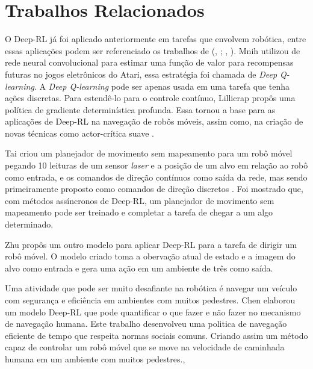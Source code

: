 \section{Trabalhos Relacionados}

O Deep-RL já foi aplicado anteriormente em tarefas que envolvem robótica, entre essas aplicações podem ser referenciado os trabalhos de (\citeauthor{kober2013reinforcement}, \citeyear{kober2013reinforcement}; \citeauthor{stone2005reinforcement}, \citeyear{stone2005reinforcement}).
Mnih \citeyearpar{mnih2013playing} utilizou de rede neural convolucional para estimar uma função de valor para recompensas futuras no jogos eletrônicos do Atari, essa estratégia foi chamada de \textit{Deep Q-learning}.
A \textit{Deep Q-learning} pode ser apenas usada em uma tarefa que tenha ações discretas. Para estendê-lo para o controle contínuo, Lillicrap \citeyearpar{lillicrap2015continuous} propôs uma política de gradiente determinística profunda.
Essa tornou a base para as aplicações de Deep-RL na navegação de robôs móveis, assim como, na criação de novas técnicas como actor-crítica suave \cite{haarnoja2018soft}.

Tai \citeyearpar{tai2017virtual} criou um planejador de movimento sem mapeamento para um robô móvel pegando 10 leituras de um sensor \textit{laser} e a posição de um alvo em relação ao robô como entrada, e os comandos de direção contínuos como saída da rede, mas sendo primeiramente proposto como comandos de direção discretos \cite{tai2016towards}. Foi mostrado que, com métodos assíncronos de Deep-RL, um planejador de movimento sem mapeamento pode ser treinado e completar a tarefa de chegar a um algo determinado.

Zhu \citeyearpar{zhu2017target} propôs um outro modelo para aplicar Deep-RL para a tarefa de dirigir um robô móvel. O modelo criado toma a obervação atual de estado e a imagem do alvo como entrada e gera uma ação em um ambiente de três como saída.

Uma atividade que pode ser muito desafiante na robótica é navegar um veículo com segurança e eficiência em ambientes com muitos pedestres. Chen \citeyearpar{chen2017socially} elaborou um modelo Deep-RL que pode quantificar o que fazer e não fazer no mecanismo de navegação humana.
Este trabalho desenvolveu uma politica de navegação eficiente de tempo que respeita normas sociais comuns. Criando assim um método capaz de controlar um robô móvel que se move na velocidade de caminhada humana em um ambiente com muitos pedestres.,

